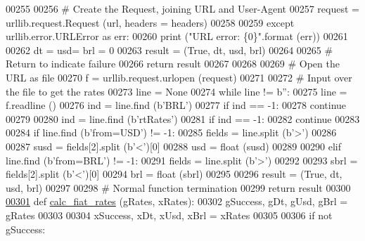 \begin{DoxyCode}
{{{00255             
00256         \textcolor{comment}{# Create the Request, joining URL and User-Agent}
00257         request = urllib.request.Request (url, headers = headers)
00258         
00259     \textcolor{keywordflow}{except} urllib.error.URLError \textcolor{keyword}{as} err:
00260         \textcolor{keywordflow}{print} (\textcolor{stringliteral}{"URL error: \{0\}"}.format (err))
00261         
00262         dt = usd= brl = 0
00263         result = (\textcolor{keyword}{True}, dt, usd, brl)
00264         
00265         \textcolor{comment}{# Return to indicate failure}
00266         \textcolor{keywordflow}{return} result
00267 
00268         
00269     \textcolor{comment}{# Open the URL as file}
00270     f = urllib.request.urlopen (request)
00271     
00272     \textcolor{comment}{# Input over the file to get the rates}
00273     line = \textcolor{keywordtype}{None}
00274     \textcolor{keywordflow}{while} line != b\textcolor{stringliteral}{''}:
00275         line = f.readline ()
00276         ind = line.find (b\textcolor{stringliteral}{'BRL'})
00277         \textcolor{keywordflow}{if} ind == -1:
00278             \textcolor{keywordflow}{continue} 
00279         
00280         ind = line.find (b\textcolor{stringliteral}{'rtRates'})
00281         \textcolor{keywordflow}{if} ind == -1:
00282             \textcolor{keywordflow}{continue} 
00283                 
00284         \textcolor{keywordflow}{if} line.find (b\textcolor{stringliteral}{'from=USD'}) != -1:
00285             fields = line.split (b\textcolor{stringliteral}{'>'})
00286             
00287             susd = fields[2].split (b\textcolor{stringliteral}{'<'})[0]
00288             usd = float (susd)
00289         
00290         \textcolor{keywordflow}{elif} line.find (b\textcolor{stringliteral}{'from=BRL'}) != -1:
00291             fields = line.split (b\textcolor{stringliteral}{'>'})
00292             
00293             sbrl = fields[2].split (b\textcolor{stringliteral}{'<'})[0]
00294             brl = float (sbrl)
00295             
00296     result = (\textcolor{keyword}{True}, dt, usd, brl)
00297     
00298     \textcolor{comment}{# Normal function termination}
00299     \textcolor{keywordflow}{return} result
00300     
\hyperlink{namespaceexch2exch_a2f3337121882596d0644f2d48ffb870c}{00301} \textcolor{keyword}{def }\hyperlink{namespaceexch2exch_a2f3337121882596d0644f2d48ffb870c}{calc\_fiat\_rates} (gRates, xRates):
00302     gSuccess, gDt, gUsd, gBrl = gRates 
00303     
00304     xSuccess, xDt, xUsd, xBrl = xRates
00305     
00306     \textcolor{keywordflow}{if} \textcolor{keywordflow}{not} gSuccess:
}}}
\end{DoxyCode}
